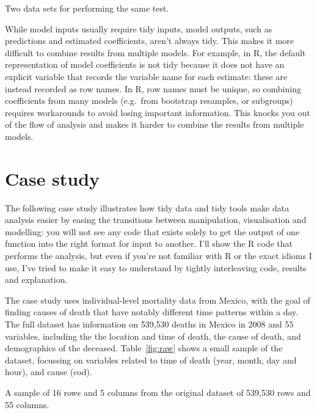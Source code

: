 \documentclass[article]{jss}
\begin{document}
\begin{table}
  \centering
  \hspace{2em}%

  \caption{Two data sets for performing the same test.}
  \label{label}
\end{table}

While model inputs usually require tidy inputs, model outputs, such as predictions and estimated coefficients, aren't always tidy. This makes it more difficult to combine results from multiple models. For example, in R, the default representation of model coefficients is not tidy because it does not have an explicit variable that records the variable name for each estimate: these are instead recorded as row names. In R, row names must be unique, so combining coefficients from many models (e.g.\ from bootstrap resamples, or subgroups) requires workarounds to avoid losing important information.  This knocks you out of the flow of analysis and makes it harder to combine the results from multiple models.

\section{Case study} 
\label{sec:case-study}

The following case study illustrates how tidy data and tidy tools make data analysis easier by easing the transitions between manipulation, visualisation and modelling: you will not see any code that exists solely to get the output of one function into the right format for input to another. I'll show the R code that performs the analysis, but even if you're not familiar with R or the exact idioms I use, I've tried to make it easy to understand by tightly interleaving code, results and explanation.

The case study uses individual-level mortality data from Mexico, with the goal of finding causes of death that have notably different time patterns within a day. The full dataset has information on 539,530 deaths in Mexico in 2008 and 55 variables, including the the location and time of death, the cause of death, and demographics of the deceased. Table~\ref{fig:raw} shows a small sample of the dataset, focussing on variables related to time of death (year, month, day and hour), and cause (cod).

\begin{table}
  \centering
  
  \caption{A sample of 16 rows and 5 columns from the original dataset of 539,530 rows and 55 columns.}
  \label{fig:raw}
\end{table}
\end{document}
